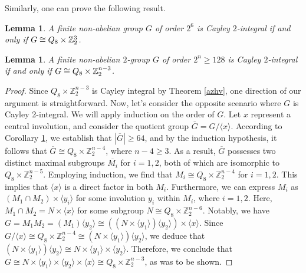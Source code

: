 \documentclass{amsart}
\newtheorem{lem}[thm]{Lemma}
\def \geq {\geqslant}
\begin{document}
	Similarly, one can prove the following result.
	\begin{lem}\label{68}
		A finite non-abelian group $G$ of order $2^6$ is Cayley $2$-integral if and only if $G\cong Q_8\times\Bbb Z_2^{3}$.
	\end{lem}
\begin{lem}\label{Dedekind}
	A finite non-abelian $2$-group $G$ of order $2^n\geq 128$ is Cayley $2$-integral if and only if $G\cong Q_8\times\Bbb Z_2^{n-3}$.
\end{lem}
\begin{proof}
Since \( Q_8 \times \mathbb{Z}_2^{n-3} \) is  Cayley integral by Theorem \ref{azhv}, one direction of our argument is straightforward. Now, let's consider the opposite scenario where \( G \) is  Cayley 2-integral. We will apply induction on the order of \( G \). Let \( x \) represent a central involution, and consider the quotient group \( \overline{G} = G/\langle x \rangle \). According to Corollary \ref{68}, we establish that \( |\overline{G}| \geq 64 \), and by the induction hypothesis, it follows that \( \overline{G} \cong Q_8 \times \mathbb{Z}_2^{n-4} \), where \( n-4 \geq 3 \). 
As a result, \( \overline{G} \) possesses two distinct maximal subgroups \( \overline{M_i} \) for \( i=1,2 \), both of which are isomorphic to \( Q_8 \times \mathbb{Z}_2^{n-5} \). Employing induction, we find that \( M_i \cong Q_8 \times \mathbb{Z}_2^{n-4} \) for \( i=1,2 \). This implies that \( \langle x \rangle \) is a direct factor in both \( M_i \).
Furthermore, we can express \( M_i \) as \( (M_1 \cap M_2) \times \langle y_i \rangle \) for some involution \( y_i \) within \( M_i \), where \( i=1,2 \). Here, \( M_1 \cap M_2 = N \times \langle x \rangle \) for some subgroup \( N \cong Q_8 \times \mathbb{Z}_2^{n-6} \). Notably, we have \( G = M_1M_2 = (M_1)\langle y_2 \rangle \cong ((N \times \langle y_1 \rangle)\langle y_2 \rangle)\times \langle x \rangle \). Since \( G/\langle x \rangle \cong Q_8 \times \mathbb{Z}_2^{n-4} \cong (N \times \langle y_1 \rangle)\langle y_2 \rangle \), we deduce that \( (N \times \langle y_1 \rangle)\langle y_2 \rangle \cong N \times \langle y_1 \rangle \times \langle y_2 \rangle \). 
Therefore, we conclude that \( G \cong N \times \langle y_1 \rangle \times \langle y_2 \rangle \times \langle x \rangle \cong Q_8 \times \mathbb{Z}_2^{n-3} \), as was to be shown. 
\end{proof}
\end{document}

